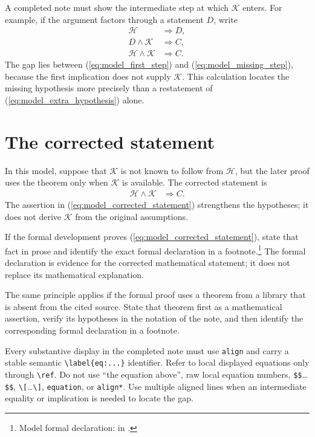 \documentclass{article}
\providecommand{\leanid}[1]{\textsf{\detokenize{#1}}}
\providecommand{\doclink}[1]{%
    \href{https://sirui-lu.com/TNLean/docs/#1.html}{\path{#1}}}
\begin{document}
A completed note must show the intermediate step at which $\mathcal K$ enters.
For example, if the argument factors through a statement $D$, write
\begin{align}
    \mathcal H
        &\Longrightarrow D,
    \label{eq:model_first_step}\\
    D\wedge\mathcal K
        &\Longrightarrow C,
    \label{eq:model_missing_step}\\
    \mathcal H\wedge\mathcal K
        &\Longrightarrow C.
    \label{eq:model_derived_claim}
\end{align}
The gap lies between (\ref{eq:model_first_step}) and
(\ref{eq:model_missing_step}), because the first implication does not supply
$\mathcal K$. This calculation locates the missing hypothesis more precisely
than a restatement of (\ref{eq:model_extra_hypothesis}) alone.

\section{The corrected statement}

In this model, suppose that $\mathcal K$ is not known to follow from
$\mathcal H$, but the later proof uses the theorem only when $\mathcal K$ is
available. The corrected statement is
\begin{align}
    \mathcal H\wedge\mathcal K &\Longrightarrow C.
    \label{eq:model_corrected_statement}
\end{align}
The assertion in (\ref{eq:model_corrected_statement}) strengthens the
hypotheses; it does not derive $\mathcal K$ from the original assumptions.

If the formal development proves (\ref{eq:model_corrected_statement}), state
that fact in prose and identify the exact formal declaration in a
footnote.\footnote{Model formal declaration:
    \leanid{modelCorrected} in \doclink{TNLean/Path/To/File}.}
The formal declaration is evidence for the corrected mathematical statement; it
does not replace its mathematical explanation.

The same principle applies if the formal proof uses a theorem from a library
that is absent from the cited source. State that theorem first as a mathematical
assertion, verify its hypotheses in the notation of the note, and then identify
the corresponding formal declaration in a footnote.

Every substantive display in the completed note must use \verb|align| and carry
a stable semantic \verb|\label{eq:...}| identifier. Refer to local displayed
equations only through \verb|\ref|. Do not use ``the equation above'', raw
local equation numbers, \verb|$$|\ldots\verb|$$|,
\verb|\[|\ldots\verb|\]|, \verb|equation|, or \verb|align*|. Use multiple
aligned lines when an intermediate equality or implication is needed to locate
the gap.
\end{document}
